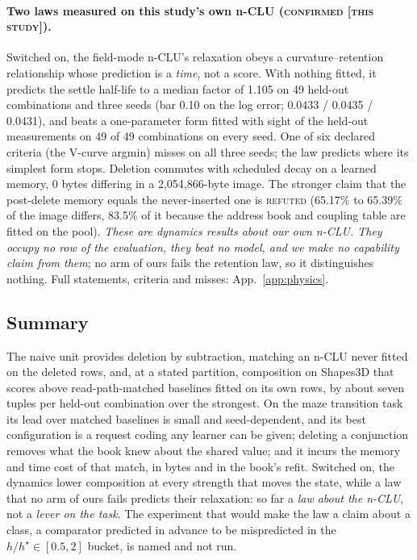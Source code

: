\documentclass{article} %
\begin{document}
\paragraph{Two laws measured on this study's own n-CLU (\textsc{confirmed [this study]}).}
Switched on, the field-mode n-CLU's relaxation obeys a curvature--retention relationship whose
prediction is a \emph{time}, not a score. With nothing fitted, it predicts the settle half-life to
a median factor of 1.105 on 49 held-out combinations and three seeds (bar 0.10 on the log error; 0.0433
/ 0.0435 / 0.0431), and beats a one-parameter form fitted with sight of the held-out
measurements on 49 of 49 combinations on every seed. One of six declared criteria (the V-curve
argmin) misses on all three seeds; the law predicts where its simplest form stops.
Deletion commutes with scheduled decay on a learned memory, 0 bytes differing in a
2,054,866-byte image. The stronger claim that the post-delete memory equals the never-inserted one is \textsc{refuted} (65.17\% to 65.39\% of the image differs, 83.5\% of it because the
address book and coupling table are fitted on the pool). %
\emph{These are dynamics results about our own n-CLU. They occupy no row of the evaluation, they
beat no model, and we make no capability claim from them}; no arm of ours fails the retention law, so it distinguishes nothing. Full statements, criteria and misses: App.~\ref{app:physics}.

\subsection{Summary}
\label{sec:leaving}

The naive unit provides deletion by subtraction, matching an n-CLU never fitted on the deleted rows, and, at a stated partition, composition on
Shapes3D that scores above read-path-matched baselines fitted on its own rows, by about seven tuples per
held-out combination over the strongest. On the maze transition task its lead over matched
baselines is small and seed-dependent, and its best configuration is a request coding any learner can be
given; deleting a conjunction removes what the book knew about the shared value; and it incurs the
memory and time cost of that match, in bytes and in the book's refit. Switched on, the dynamics lower composition at
every strength that moves the state, while a law that no arm of ours fails predicts their relaxation:
so far a \emph{law about the n-CLU}, not a \emph{lever on the task}. The experiment that would make
the law a claim about a class, a comparator predicted in advance to be mispredicted in the
$h/h^\star\in[0.5,2]$ bucket, is named and not run. %
\end{document}

